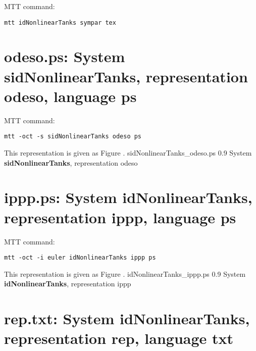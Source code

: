 MTT command:
\begin{verbatim}
mtt idNonlinearTanks sympar tex 
\end{verbatim}
  


\section{\textbf{odeso.ps}: System sidNonlinearTanks, representation \textbf{odeso}, language \textbf{ps}}
\label{sec:sidNonlinearTanks_odeso.ps}


MTT command:
\begin{verbatim}
mtt -oct -s sidNonlinearTanks odeso ps 
\end{verbatim}
This representation is given as Figure .
    {sidNonlinearTanks_odeso.ps}
    {0.9}
    {System \textbf{sidNonlinearTanks}, representation odeso}


\section{\textbf{ippp.ps}: System idNonlinearTanks, representation \textbf{ippp}, language \textbf{ps}}
\label{sec:idNonlinearTanks_ippp.ps}


MTT command:
\begin{verbatim}
mtt -oct -i euler idNonlinearTanks ippp ps 
\end{verbatim}
This representation is given as Figure .
    {idNonlinearTanks_ippp.ps}
    {0.9}
    {System \textbf{idNonlinearTanks}, representation ippp}


\section{\textbf{rep.txt}: System idNonlinearTanks, representation \textbf{rep}, language \textbf{txt}}
\label{sec:idNonlinearTanks_rep.txt}


